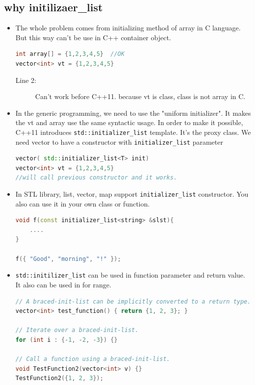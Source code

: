 \documentclass[a4paper,11pt,twoside]{book}
\begin{document}
\subsection{why initilizaer\_list}
\begin{itemize}
	\item The whole problem comes from initializing method of array in C language. But this way can't be use in C++ container object.
\begin{lstlisting}[frame=single, language=c++,mathescape=true]
int array[] = {1,2,3,4,5}  //OK 
vector<int> vt = {1,2,3,4,5} 
\end{lstlisting}
\begin{description}
	\item[Line 2:] Can't work before C++11. because vt is class, class is not array in C. 
\end{description}	
	
	\item In the generic programming, we need to use the "uniform initializer". It  makes the vt and array use the same syntactic usage. In order to make it possible, C++11 introduces \texttt{std::initializer\_list} template. It's the proxy class. We need vector to have a constructor with \texttt{initializer\_list} parameter
\begin{lstlisting}[frame=single, language=c++,mathescape=true]
vector( std::initializer_list<T> init)
vector<int> vt = {1,2,3,4,5} 
//will call previous constructor and it works. 
\end{lstlisting}
	
	
	
	\item In STL library, list, vector, map support \texttt{initializer\_list} constructor. You also can use it in your own class or function.
\begin{lstlisting}[frame=single, language=c++,mathescape=true]
void f(const initializer_list<string> &slst){
	....
}
	
f({ "Good", "morning", "!" });
\end{lstlisting}
	
	\item \texttt{std::initilizer\_list} can be used in function parameter and return value. It also can be used in for range.  
\begin{lstlisting}[frame=single, language=c++,mathescape=true]
// A braced-init-list can be implicitly converted to a return type.
vector<int> test_function() { return {1, 2, 3}; }
	
// Iterate over a braced-init-list.
for (int i : {-1, -2, -3}) {}
	
// Call a function using a braced-init-list.
void TestFunction2(vector<int> v) {}
TestFunction2({1, 2, 3}); 
\end{lstlisting}

\end{itemize}
\end{document}
